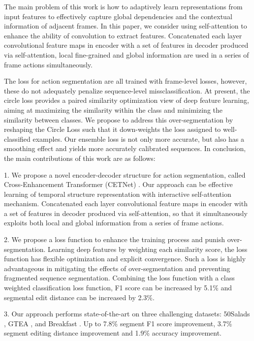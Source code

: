 \documentclass[runningheads]{llncs}
\begin{document}
\par{
	The main problem of this work is how to adaptively learn representations from input features to effectively capture global dependencies and the contextual information of adjacent frames. In this paper, we consider using self-attention to enhance the ability of convolution to extract features. Concatenated each layer convolutional feature maps in encoder with a set of features in decoder produced via self-attention, local fine-grained and global information are used in a series of frame actions simultaneously.
}
\par{
	The loss for action segmentation are all trained with frame-level losses, however, these do not adequately penalize sequence-level missclassification. At present, the circle loss provides a paired similarity optimization view of deep feature learning, aiming at maximizing the similarity within the class and minimizing the similarity between classes. We propose to address this over-segmentation by reshaping the Circle Loss \cite{sun2020circle} such that it down-weights the loss assigned to well-classified examples. Our ensemble loss is not only more accurate, but also has a smoothing effect and yields more accurately calibrated sequences. In conclusion, the main contributions of this work are as follows:
}
\par{1. We propose a novel encoder-decoder structure for action segmentation, called Cross-Enhancement Transformer (CETNet) . Our approach can be effective learning of temporal structure representation with interactive self-attention mechanism. Concatenated each layer convolutional feature maps in encoder with a set of features in decoder produced via self-attention, so that it simultaneously exploits both local and global information from a series of frame actions.}
\par{
2. We propose a loss function to enhance the training process and punish over-segmentation. Learning deep features by weighting each similarity score, the loss function has flexible optimization and explicit convergence. Such a loss is highly advantageous in mitigating the effects of over-segmentation and preventing fragmented sequence segmentation. Combining the loss function with a class weighted classification loss function, F1 score can be increased by 5.1\% and segmental edit distance can be increased by 2.3\%.
}
\par{
3. Our approach performs state-of-the-art on three challenging datasets: 50Salads \cite{stein2013combining}, GTEA \cite{fathi2011learning}, and Breakfast \cite{kuehne2014language}. Up to 7.8\% segment F1 score improvement, 3.7\% segment editing distance improvement and 1.9\% accuracy improvement.
}
\end{document}
